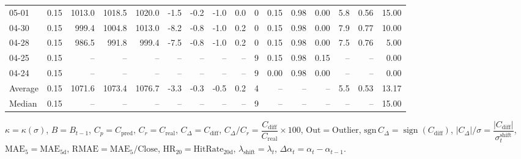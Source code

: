 \begin{threeparttable}
{\begin{tabular}{lrrrrrrrrrrrrrrr}
  05-01 &     0.15 & 1013.0 & 1018.5 & 1020.0 &       -1.5 &           -0.2 &                     -1.0 &                 0.0 &              0 &       0.15 &      0.98 &           0.00 &              5.8 &            0.56 &                  15.00 \\
  04-30 &     0.15 &  999.4 & 1004.8 & 1013.0 &       -8.2 &           -0.8 &                     -1.0 &                 0.2 &              0 &       0.15 &      0.98 &           0.00 &              7.9 &            0.77 &                  10.00 \\
  04-28 &     0.15 &  986.5 &  991.8 &  999.4 &       -7.5 &           -0.8 &                     -1.0 &                 0.2 &              0 &       0.15 &      0.98 &           0.00 &              7.5 &            0.76 &                   5.00 \\
  04-25 &     0.15 &     -- &     -- &     -- &         -- &             -- &                       -- &                  -- &              9 &       0.15 &      0.98 &           0.15 &               -- &              -- &                   0.00 \\
  04-24 &     0.15 &     -- &     -- &     -- &         -- &             -- &                       -- &                  -- &              9 &       0.00 &      0.98 &           0.00 &               -- &              -- &                   0.00 \\
Average &     0.15 & 1071.6 & 1073.4 & 1076.7 &       -3.3 &           -0.3 &                     -0.5 &                 0.2 &              4 &         -- &        -- &             -- &              5.5 &            0.53 &                  13.17 \\
 Median &     0.15 &     -- &     -- &     -- &         -- &             -- &                       -- &                  -- &              9 &         -- &        -- &             -- &               -- &              -- &                  15.00 \\
\bottomrule
\end{tabular}
}
\begin{tablenotes}\footnotesize
\item $\kappa=\kappa(\sigma)$, $B=B_{t-1}$, $C_p=C_{\text{pred}}$, $C_r=C_{\text{real}}$, $C_\Delta=C_{\text{diff}}$, $C_\Delta/C_r=\dfrac{C_{\text{diff}}}{C_{\text{real}}}\times100$, $\mathrm{Out}=\text{Outlier}$, $\mathrm{sgn}\,C_\Delta=\operatorname{sign}(C_{\text{diff}})$, $|C_\Delta|/\sigma=\dfrac{|C_{\text{diff}}|}{\sigma_t^{\text{shift}}}$, $\mathrm{MAE}_5=\mathrm{MAE}_{5\text{d}}$, $\mathrm{RMAE}= \mathrm{MAE}_5 / \text{Close}$, $\mathrm{HR}_{20}=\mathrm{HitRate}_{20\text{d}}$, 
$\lambda_{\text{shift}}=\lambda_t$, 
$\Delta\alpha_t=\alpha_t-\alpha_{t-1}$.
\end{tablenotes}
\end{threeparttable}
\endgroup


